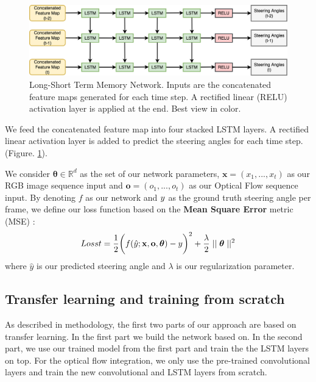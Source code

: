 \documentclass[10pt,twocolumn,letterpaper]{article}
\begin{document}
 
  \begin{figure} [ht]
 	\centering
 	\includegraphics[scale=0.13]{lstm_network}
 	\caption{Long-Short Term Memory Network. Inputs are the concatenated feature maps generated for each time step. A rectified linear (RELU) activation layer is applied at the end. Best view in color.}
 	\label{fig:lstmNet}
 \end{figure}

We feed the concatenated feature map into four stacked LSTM layers. A rectified linear activation layer is added to predict the steering angles for each time step. (Figure. \ref{fig:lstmNet}). 

We consider $\boldsymbol{\theta} \in \mathbb{R}^d$ as the set of our network parameters, $\mathbf{x}  = (x_1, ..., x_t)$ as our RGB image sequence input and $\mathbf{o} = (o_1, ..., o_t)$ as our Optical Flow sequence input. By denoting $f$ as our network and $\mathnormal{y}$ as the ground truth steering angle per frame, we define our loss function based on the \textbf{Mean Square Error} metric (MSE) : 
\begin{align}
\mathnormal{Losst} = \frac{1}{2}\bigg( f(\hat{y}; \mathbf{x}, \mathbf{o}, \boldsymbol{\theta}) - \mathnormal{y} \bigg)^{2} + \frac{\lambda}{2}\mid \mid \boldsymbol{\theta} \mid \mid ^2
\label{eq:loss}
\end{align}
where $\hat{y}$ is our predicted steering angle and $\lambda$ is our regularization parameter. 

\subsection{Transfer learning and training from scratch}
As described in methodology, the first two parts of our approach are based on transfer learning. In the first part we build the network based on\cite{DBLP:journals/corr/BojarskiTDFFGJM16}. In the second part, we use our trained model from the first part and train the the LSTM layers on top. For the optical flow integration, we only use the pre-trained convolutional layers and train the new convolutional and LSTM layers from scratch.
\end{document}
